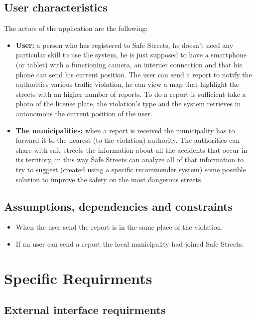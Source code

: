 \documentclass[12pt,a4paper]{report}
\begin{document}
	\section{User characteristics}
		The actors of the application are the following:
		\begin{itemize}
			\item \textbf{User:}
				a person who has registered to Safe Streets, he doesn't need any particular skill to use the system, 
				he is just supposed to have a smartphone (or tablet) with a functioning camera, an internet connection and
				that his phone can send his current position. The user can send a report to notify the authorities various traffic
				violation, he can view a map that highlight the streets with an higher number of reports. To do a report is sufficient
				take a photo of the license plate, the violation's type and the system retrieves in autonomous the current position
				of the user.
			\item \textbf{The municipalities:}
				when a report is received the municipality has to forward it to the nearest (to the violation) authority.
				The authorities can share with safe streets the information about all the accidents that occur in its territory,
				in this way Safe  Streets can analyze all of that information to try to suggest (created using a specific recommender system) some possible solution to improve
				the safety on the most dangerous streets.
		\end{itemize}
	\section{Assumptions, dependencies and constraints}
		\begin{itemize}
			\item When the user send the report is in the same place of the violation.
			\item If an user can send a report the local municipality had joined Safe Streets.
		\end{itemize}

\chapter{Specific Requirments}
	\section{External interface requirments}
\end{document}
